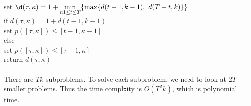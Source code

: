 \documentclass{article}
\newcommand{\ka}{\kappa}
\newcommand{\ds}{\displaystyle}
\begin{document}
	\hspace*{21mm} set $\ds \d(\tau, \ka) = 1 + \min_{t : 1\leq t \leq T}\{\max\{d(t-1, k-1),\ d(T-t, k)\}\}$\\
	\hspace*{21mm} if $d(\tau, \ka) = 1 + d(t-1, k-1)$\\
	\hspace*{28mm} set $p([\tau, \ka]) \leq [t-1, \ka-1]$\\
	\hspace*{21mm} else\\
	\hspace*{28mm} set $p([\tau, \ka]) \leq [\tau-1, \ka]$\\
	\hspace*{7mm} return $d(\tau, \ka)$\\
---------------------------------------------------------------------------------------------------------\\
There are $Tk$ subproblems. To solve each subproblem, we need to look at $2T$ smaller problems. Thus the time complxity is $O(T^2k)$, which is polynomial time.
\end{document}

